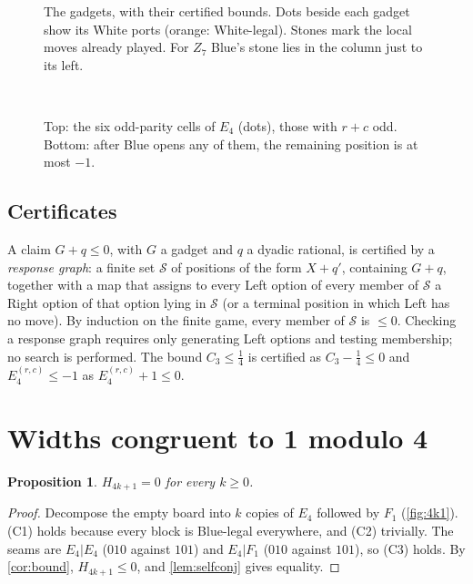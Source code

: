 \documentclass[11pt]{amsart}
\newtheorem{proposition}[theorem]{Proposition}
\theoremstyle{definition}
\begin{document}
\begin{figure}[ht]
\centering
{}
\caption{The gadgets, with their certified bounds. Dots beside each gadget
show its White ports (orange: White-legal). Stones mark the local moves already
played. For $Z_7$ Blue's stone lies in the column just to its left.}
\label{fig:gallery}
\end{figure}

\begin{figure}[ht]
\centering
{}\\[4pt]
\caption{Top: the six odd-parity cells of $E_4$ (dots), those with $r+c$
odd. Bottom: after Blue opens any of them, the remaining position is at most
$-1$.}
\label{fig:opened}
\end{figure}

\subsection{Certificates}\label{sec:certs}
A claim $G+q\le0$, with $G$ a gadget and $q$ a dyadic rational, is certified by
a \emph{response graph}: a finite set $\mathcal S$ of positions of the form
$X+q'$, containing $G+q$, together with a map that assigns to every Left option
of every member of $\mathcal S$ a Right option of that option lying in
$\mathcal S$ (or a terminal position in which Left has no move). By induction on
the finite game, every member of $\mathcal S$ is $\le0$. Checking a response
graph requires only generating Left options and testing membership; no search
is performed. The bound $C_3\le\tfrac14$ is certified as $C_3-\tfrac14\le0$
and $E_4^{(r,c)}\le-1$ as $E_4^{(r,c)}+1\le0$.

\section{Widths congruent to 1 modulo 4}\label{sec:4k1}

\begin{proposition}\label{prop:4k1}
$H_{4k+1}=0$ for every $k\ge0$.
\end{proposition}

\begin{proof}
Decompose the empty board into $k$ copies of $E_4$ followed by $F_1$
(\cref{fig:4k1}). (C1) holds because every block is Blue-legal everywhere,
and (C2) trivially. The seams are $E_4|E_4$ ($010$ against $101$) and
$E_4|F_1$ ($010$ against $101$), so (C3) holds. By \cref{cor:bound},
$H_{4k+1}\le0$, and \cref{lem:selfconj} gives equality.
\end{proof}
\end{document}
